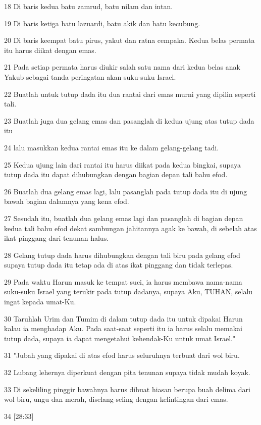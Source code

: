 \par 18 Di baris kedua batu zamrud, batu nilam dan intan.
\par 19 Di baris ketiga batu lazuardi, batu akik dan batu kecubung.
\par 20 Di baris keempat batu pirus, yakut dan ratna cempaka. Kedua belas permata itu harus diikat dengan emas.
\par 21 Pada setiap permata harus diukir salah satu nama dari kedua belas anak Yakub sebagai tanda peringatan akan suku-suku Israel.
\par 22 Buatlah untuk tutup dada itu dua rantai dari emas murni yang dipilin seperti tali.
\par 23 Buatlah juga dua gelang emas dan pasanglah di kedua ujung atas tutup dada itu
\par 24 lalu masukkan kedua rantai emas itu ke dalam gelang-gelang tadi.
\par 25 Kedua ujung lain dari rantai itu harus diikat pada kedua bingkai, supaya tutup dada itu dapat dihubungkan dengan bagian depan tali bahu efod.
\par 26 Buatlah dua gelang emas lagi, lalu pasanglah pada tutup dada itu di ujung bawah bagian dalamnya yang kena efod.
\par 27 Sesudah itu, buatlah dua gelang emas lagi dan pasanglah di bagian depan kedua tali bahu efod dekat sambungan jahitannya agak ke bawah, di sebelah atas ikat pinggang dari tenunan halus.
\par 28 Gelang tutup dada harus dihubungkan dengan tali biru pada gelang efod supaya tutup dada itu tetap ada di atas ikat pinggang dan tidak terlepas.
\par 29 Pada waktu Harun masuk ke tempat suci, ia harus membawa nama-nama suku-suku Israel yang terukir pada tutup dadanya, supaya Aku, TUHAN, selalu ingat kepada umat-Ku.
\par 30 Taruhlah Urim dan Tumim di dalam tutup dada itu untuk dipakai Harun kalau ia menghadap Aku. Pada saat-saat seperti itu ia harus selalu memakai tutup dada, supaya ia dapat mengetahui kehendak-Ku untuk umat Israel."
\par 31 "Jubah yang dipakai di atas efod harus seluruhnya terbuat dari wol biru.
\par 32 Lubang lehernya diperkuat dengan pita tenunan supaya tidak mudah koyak.
\par 33 Di sekeliling pinggir bawahnya harus dibuat hiasan berupa buah delima dari wol biru, ungu dan merah, diselang-seling dengan kelintingan dari emas.
\par 34 [28:33]
